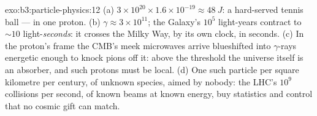 \begin{solution}{exo:b3:particle-physics:12}
(a) $3\times10^{20}\times1.6\times10^{-19} \approx \qty{48}{J}$:
a hard-served tennis ball --- in one proton. (b) $\gamma \approx
3\times10^{11}$; the Galaxy's $10^{5}$ light-years contract to
${\sim}10$ light-\emph{seconds}: it crosses the Milky Way, by
its own clock, in seconds. (c) In the proton's frame the CMB's
meek microwaves arrive blueshifted into $\gamma$-rays energetic
enough to knock pions off it: above the threshold the universe
itself is an absorber, and such protons must be local. (d) One
such particle per square kilometre per century, of unknown
species, aimed by nobody: the LHC's $10^{9}$ collisions per
second, of known beams at known energy, buy statistics and
control that no cosmic gift can match.
\end{solution}

